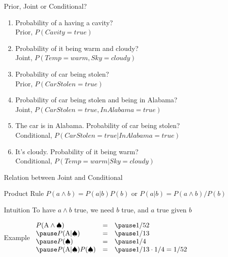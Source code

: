 \documentclass[14pt]{beamer}
\begin{document}
\begin{frame}{Prior, Joint or Conditional?}
\begin{enumerate}
\item Probability of a having a cavity? \\
\pause Prior, $P(\textit{Cavity}=\textit{true})$
\pause
\item Probability of it being warm and cloudy? \\
\pause Joint, $P(\textit{Temp}=\textit{warm}, \textit{Sky}=\textit{cloudy})$
\pause
\item Probability of car being stolen? \\
\pause Prior, $P(\textit{CarStolen}=\textit{true})$
\pause
\item Probability of car being stolen and being in Alabama? \\
\pause Joint, $P(\textit{CarStolen}=\textit{true}, \textit{InAlabama}=\textit{true})$
\pause
\item The car is in Alabama. Probability of car being stolen? \\
\pause Conditional, $P(\textit{CarStolen}=\textit{true}|\textit{InAlabama}=\textit{true})$
\pause
\item It's cloudy. Probability of it being warm? \\
\pause Conditional, $P(\textit{Temp}=\textit{warm}| \textit{Sky}=\textit{cloudy})$
\end{enumerate}
\end{frame}

\begin{frame}{Relation between Joint and Conditional}
\begin{block}{Product Rule}
$P(a \land b) = P(a|b)P(b)$ \hfill or \hfill $P(a|b) = P(a \land b)/P(b)$
\end{block}
\pause
\begin{block}{Intuition}
To have $a \land b$ true, we need $b$ true, and $a$ true given $b$
\end{block}
\pause
\begin{block}{Example}
$
\begin{array}{lll}
P(\mbox{A} \land \spadesuit) & = & \pause 1/52 \\
\pause
P(\mbox{A}|\spadesuit) & = & \pause 1/13 \\
\pause
P(\spadesuit) & = & \pause 1/4  \\
\pause
P(\mbox{A}|\spadesuit)P(\spadesuit) & = & \pause 1/13 \cdot 1/4 = 1/52 \\
\end{array}
$
\end{block}
\end{frame}
\end{document}
